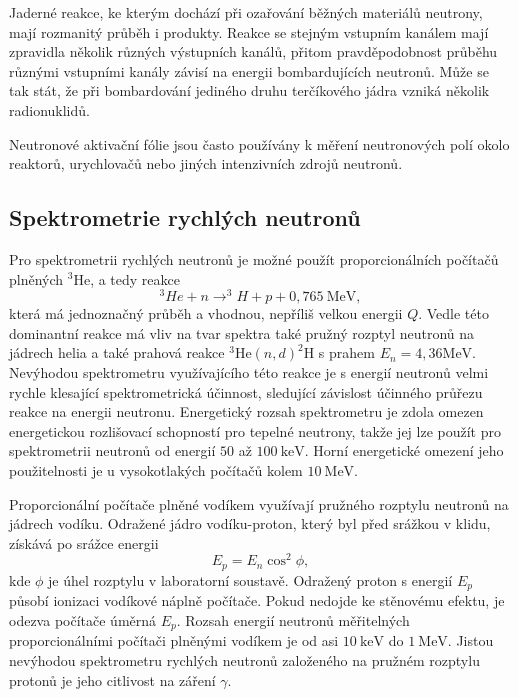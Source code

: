 \documentclass[../../main.tex]{subfiles}
\begin{document}
Jaderné reakce, ke kterým dochází při ozařování běžných materiálů neutrony, mají rozmanitý průběh i produkty. Reakce se stejným vstupním kanálem mají zpravidla několik různých výstupních kanálů, přitom pravděpodobnost průběhu různými vstupními kanály závisí na energii bombardujících neutronů. Může se tak stát, že při bombardování jediného druhu terčíkového jádra vzniká několik radionuklidů.

Neutronové aktivační fólie jsou často používány k měření neutronových polí okolo reaktorů, urychlovačů nebo jiných intenzivních zdrojů neutronů.  

\subsection{Spektrometrie rychlých neutronů}  

Pro spektrometrii rychlých neutronů je možné použít proporcionálních počítačů plněných $^{3}$He, a tedy reakce
\begin{equation}
^{3}He + n \rightarrow ^{3}H + p + 0,765 ~\mathrm{MeV},
\end{equation}
která má jednoznačný průběh a vhodnou, nepříliš velkou energii $Q$. Vedle této dominantní reakce má vliv na tvar spektra také pružný rozptyl neutronů na jádrech helia a také prahová reakce $^{3}$He$(n,d)^{2}$H s prahem $E_n = 4,36 \mathrm{MeV}$. Nevýhodou spektrometru využívajícího této reakce je s energií neutronů velmi rychle klesající spektrometrická účinnost, sledující závislost účinného průřezu reakce na energii neutronu. Energetický rozsah spektrometru je zdola omezen energetickou rozlišovací schopností pro tepelné neutrony, takže jej lze použít pro spektrometrii neutronů od energií $50$ až $100 ~\mathrm{keV}$. Horní energetické omezení jeho použitelnosti je u vysokotlakých počítačů kolem $10 ~\mathrm{MeV}$. 

Proporcionální počítače plněné vodíkem využívají pružného rozptylu neutronů na jádrech vodíku. Odražené jádro vodíku-proton, který byl před srážkou v klidu, získává po srážce energii
\begin{equation}
E_p = E_n \cos^2 \phi,
\end{equation} 
kde $\phi$ je úhel rozptylu v laboratorní soustavě. Odražený proton s energií $E_p$ působí ionizaci vodíkové náplně počítače. Pokud nedojde ke stěnovému efektu, je odezva počítače úměrná $E_p$. Rozsah energií neutronů měřitelných proporcionálními počítači plněnými vodíkem je od asi $10 ~\mathrm{keV}$ do $1 ~\mathrm{MeV}$. Jistou nevýhodou spektrometru rychlých neutronů založeného na pružném rozptylu protonů je jeho citlivost na záření $\gamma$. 
	
\end{document}
